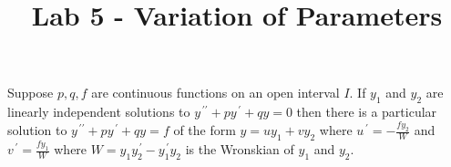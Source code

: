 \documentclass{ximera}
\begin{document}
\begin{abstract}
 \end{abstract}

    \title{Lab 5 - Variation of Parameters }
    
    \maketitle


Suppose $p,q,f$ are continuous functions on an open interval $I$.  If $y_1$ and $y_2$ are linearly independent solutions to $y^{\,\prime\prime}+py^{\,\prime}+qy=0$ then there is a particular solution to $y^{\,\prime\prime}+py^{\,\prime}+qy=f$ of the form $y=uy_1+vy_2$ where $\displaystyle u^{\,\prime}=-\frac{fy_2}{W}$ and $\displaystyle v^{\,\prime}=\frac{fy_1}{W}$ where $W=y_1y_2^{\,\prime}-y_1^{\,\prime}y_2$ is the Wronskian of $y_1$ and $y_2$.
    
\end{document}
